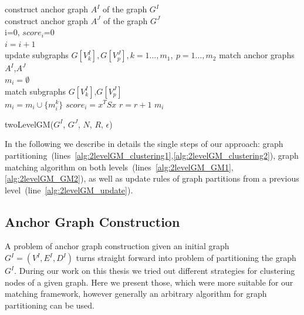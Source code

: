 \begin{algorithm}[h]
	construct anchor graph $A^I$ of the graph $G^I$ \label{alg:2levelGM_clustering1}\\
	construct anchor graph $A^J$ of the graph $G^J$ \label{alg:2levelGM_clustering2}\\
	i=0, $score_i$=0\\
	{ $i=i+1$ \\
	  {update subgraphs $G[V^I_k],G[V^J_p],k=1\dots,m_1,\ p=1\dots,m_2$ \label{alg:2levelGM_update}}
	  match anchor graphs $A^I$,$A^J$ \label{alg:2levelGM_GM1} \\
	  $m_i=\emptyset$\\
	  {match subgraphs $G[V^I_k]$,$G[V^J_p]$ \label{alg:2levelGM_GM2}\\
	   $m_i=m_i\cup\{m^k_i\}$\hspace{55pt}
	  }
	  $score_i=x^TSx$ \hspace{5pt}
	  {$r=r+1$}
	}
	\Return $m_i$
	\caption{twoLevelGM($G^I$, $G^J$, $N$, $R$, $\epsilon$)} \label{alg:2levelGM}
\end{algorithm}

In the following we describe in details the single steps of our approach: %
graph partitioning~(lines~\ref{alg:2levelGM_clustering1},\ref{alg:2levelGM_clustering2}), graph matching algorithm on both levels~(lines~\ref{alg:2levelGM_GM1},\ref{alg:2levelGM_GM2}), as well as update rules of graph partitions from a previous level~(line~\ref{alg:2levelGM_update}).
\FloatBarrier
\subsection{Anchor Graph Construction}
A problem of anchor graph construction given an initial graph $G^I=(V^I,E^I,D^I)$ turns straight forward into problem of partitioning the graph $G^I$. During our work on this thesis we tried out different strategies for clustering nodes of a given graph. Here we present those, which were more suitable for our matching framework, however generally an arbitrary algorithm for graph partitioning can be used.

